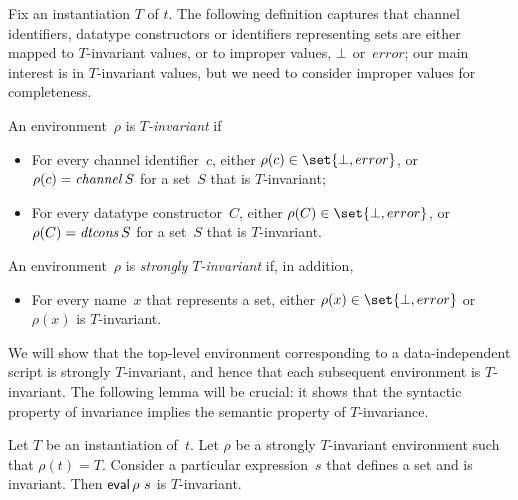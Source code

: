 
Fix an instantiation $T$ of $t$.
The following definition captures that channel identifiers, datatype
constructors or identifiers representing sets are either mapped to
$T$-invariant values, or to improper values, $\perp$ or~$error$; our main
interest is in $T$-invariant values, but we need to consider improper values
for completeness.
%
\begin{definition}
An environment~$\rho$ is \emph{$T$-invariant} if
%
\begin{itemize}
\item For every channel identifier~$c$, either $\rho(c) \in \set{\bottom,
  error}$, or $\rho(c) = \mathop{\it channel} S$ for a set~$S$ that is $T$-invariant;

\item For every datatype constructor~$C$, either $\rho(C) \in \set{\bottom,
  error}$, or $\rho(C) = \mathop{\it dtcons} S$ for a set~$S$ that is $T$-invariant.
\end{itemize}
%
An environment~$\rho$ is \emph{strongly $T$-invariant} if, in addition,
%
\begin{itemize}
\item For every name~$x$ that represents a set, either $\rho(x) \in
  \set{\bottom, error}$ or $\rho(x)$ is $T$-invariant.
\end{itemize}
\end{definition}

We will show that the top-level environment corresponding to a
data-independent script is strongly $T$-invariant, and hence that each
subsequent environment is $T$-invariant.  The following lemma will be crucial:
it shows that the syntactic property of invariance implies the semantic
property of $T$-invariance.
%
\begin{lemma}
\label{lem:invariant}
Let $T$ be an instantiation of~$t$.  Let $\rho$ be a strongly $T$-invariant
environment such that $\rho(t) = T$.
%
Consider a particular expression~$s$ that defines a set and is invariant.
Then $\mathop{\sf eval} \rho~s$ is $T$-invariant.
\end{lemma}


